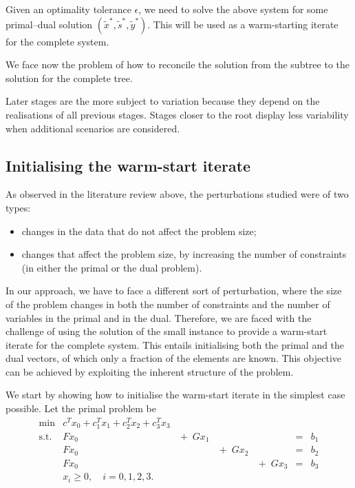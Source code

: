 {Given an optimality tolerance $\epsilon$, we need to solve 
the above system for some primal--dual solution 
$(\tilde{x}^*, \tilde{s}^*, \tilde{y}^*)$. This will be used 
as a warm-starting iterate for the complete system.

We face now the problem of how to reconcile the solution from 
the subtree to the solution for the complete tree.

\hrulefill

Later stages are the more subject to variation because they 
depend on the realisations of all previous stages. Stages 
closer to the root display less variability when additional 
scenarios are considered.

%
%
\subsection{Initialising the warm-start iterate}

As observed in the literature review above, the perturbations 
studied were of two types:
\begin{itemize}
\item changes in the data that do not affect the problem size;
\item changes that affect the problem size, by increasing the 
number of constraints (in either the primal or the dual problem).
\end{itemize}

In our approach, we have to face a different sort of 
perturbation, where the size of the problem changes in both 
the number of constraints and the number of variables in the 
primal and in the dual. Therefore, we are faced with the 
challenge of using the solution of the small instance to 
provide a warm-start iterate for the complete system. This 
entails initialising both the primal and the dual vectors, of 
which only a fraction of the elements are known. This objective 
can be achieved by exploiting the inherent structure of the problem.

We start by showing how to initialise the warm-start iterate 
in the simplest case possible. Let the primal problem be
\[
\begin{array}{rllllll}
  \min & c^T x_0 + c_1^Tx_1 + c_2^Tx_2 + c_3^Tx_3 \\
  \mbox{s.t.} & Fx_0 &   \!\!\! + \; Gx_1 &&& = & b_1 \\
              & Fx_0 &&  \!\!\! + \; Gx_2 &&  = & b_2 \\
              & Fx_0 &&& \!\!\! + \; Gx_3 &   = & b_3 \\
              & x_i \ge 0, \quad i = 0, 1, 2, 3.
\end{array}
\]

}

